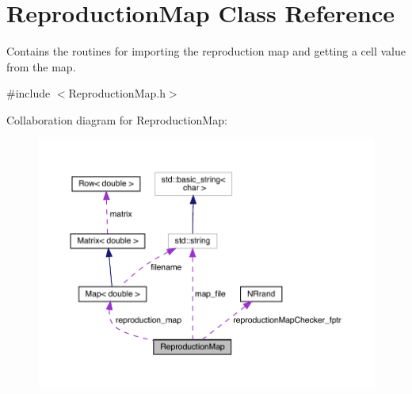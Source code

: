 \hypertarget{class_reproduction_map}{}\section{Reproduction\+Map Class Reference}
\label{class_reproduction_map}


Contains the routines for importing the reproduction map and getting a cell value from the map.  




{\ttfamily \#include $<$Reproduction\+Map.\+h$>$}



Collaboration diagram for Reproduction\+Map\+:\nopagebreak
\begin{figure}[H]
\begin{center}
\leavevmode
\includegraphics[width=350pt]{class_reproduction_map__coll__graph}
\end{center}
\end{figure}
